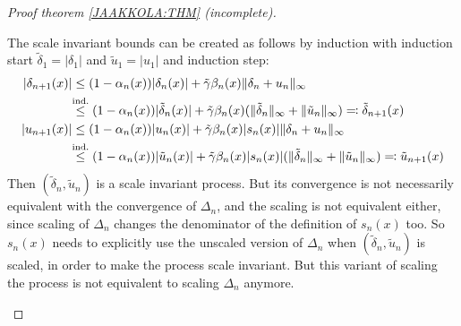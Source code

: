 \begin{proof}[Proof theorem \ref{JAAKKOLA:THM} (incomplete)]
\begin{enumerate}[label= Step \arabic*:, ref= Step \arabic*, leftmargin=0pt]
    The scale invariant bounds can be created as follows by induction with induction start \(\tilde{\delta}_1=|\delta_1|\) and \(\tilde{u}_1=|u_1|\) and induction step:
    \begin{align*}
        |\delta_{n+1}(x)| 
        &\le (1-\alpha_n(x))|\delta_n(x)|+ \tilde{\gamma} \beta_n(x)\|\delta_n + u_n\|_\infty\\
        &\lxlq{\text{ind.}} (1-\alpha_n(x))|\tilde{\delta}_n(x)|+ \tilde{\gamma} \beta_n(x)(\|\tilde{\delta}_n\|_\infty+\|\tilde{u}_n\|_\infty)
        \eqqcolon \tilde{\delta}_{n+1}(x)\\
        |u_{n+1}(x)|
        &\le (1-\alpha_n(x))|u_n(x)| +\tilde{\gamma} \beta_n(x)|s_n(x)|\|\delta_n+u_n\|_\infty\\
        &\lxlq{\text{ind.}} (1-\alpha_n(x))|\tilde{u}_n(x)| +\tilde{\gamma} \beta_n(x)|s_n(x)|(\|\tilde{\delta}_n\|_\infty+\|\tilde{u}_n\|_\infty)
        \eqqcolon \tilde{u}_{n+1}(x)
    \end{align*}
    Then \((\tilde{\delta}_n,\tilde{u}_n)\) is a scale invariant process. But its convergence is not necessarily equivalent with the convergence of \(\Delta_n\), and the scaling is not equivalent either, since scaling of \(\Delta_n\) changes the denominator of the definition of \(s_n(x)\) too.
    So \(s_n(x)\) needs to explicitly use the unscaled version of \(\Delta_n\) when \((\tilde{\delta}_n,\tilde{u}_n)\) is scaled, in order to make the process scale invariant. But this variant of scaling the process is not equivalent to scaling \(\Delta_n\) anymore. \qedhere
\end{enumerate}
\end{proof}

\endinput